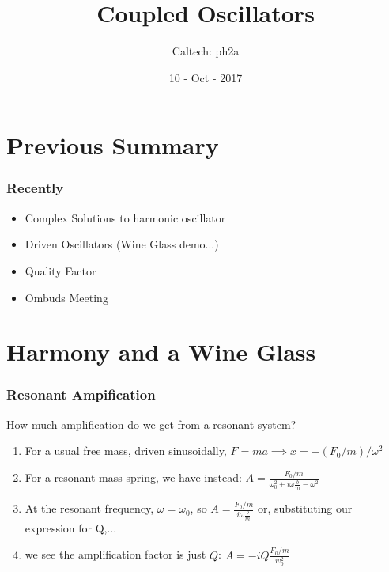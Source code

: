 \documentclass[pdf,hideothersubsections]{beamer}
\begin{document}
\title{Coupled Oscillators}  
\author{Caltech: ph2a}
\date{10 - Oct - 2017}

\frame{\titlepage} 



\section{Previous Summary}
\begin{frame}
\frametitle{Recently}
\begin{itemize}
\item Complex Solutions to harmonic oscillator
\item Driven Oscillators (Wine Glass demo...)
\item Quality Factor
\item Ombuds Meeting
\end{itemize}
\end{frame}


\section{Harmony and a Wine Glass}
\begin{frame}
\frametitle{Resonant Ampification}
How much amplification do we get from a resonant system?
\pause
\begin{enumerate}
\item For a usual free mass, driven sinusoidally, $F = m a \implies x = - (F_0/m) / \omega^2$
\pause
\item For a resonant mass-spring, we have instead: $A =
  \frac{F_0/m}{\omega_0^2 + i \omega \frac{b}{m} - \omega^2}$
\pause
\item At the resonant frequency, $\omega = \omega_0$, so $A =
  \frac{F_0/m}{i \omega \frac{b}{m}}$ or, substituting our expression
  for Q,...
\pause
\item we see the amplification factor is just $Q$:  $A = -i Q \frac{F_0/m}{w_0^2}$

\end{enumerate}

\end{frame}
\end{document}
